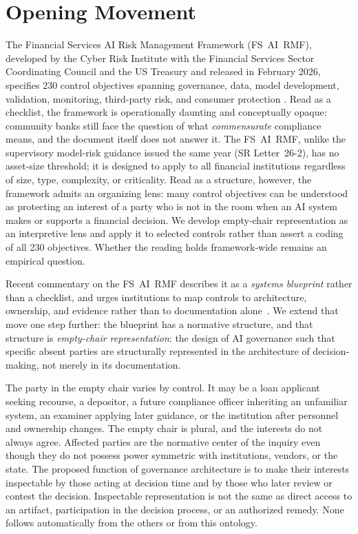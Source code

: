 %

\section{Opening Movement}
\label{sec:opening}

The Financial Services AI Risk Management Framework (FS~AI~RMF), developed by the Cyber Risk Institute with the Financial Services Sector Coordinating Council and the US Treasury and released in February 2026, specifies 230 control objectives spanning governance, data, model development, validation, monitoring, third-party risk, and consumer protection \parencite{treasuryFSAIRMFRelease2026}. Read as a checklist, the framework is operationally daunting and conceptually opaque: community banks still face the question of what \emph{commensurate} compliance means, and the document itself does not answer it. The FS~AI~RMF, unlike the supervisory model-risk guidance issued the same year (SR Letter~26-2), has no asset-size threshold; it is designed to apply to all financial institutions regardless of size, type, complexity, or criticality. Read as a structure, however, the framework admits an organizing lens: many control objectives can be understood as protecting an interest of a party who is not in the room when an AI system makes or supports a financial decision. We develop empty-chair representation as an interpretive lens and apply it to selected controls rather than assert a coding of all 230 objectives. Whether the reading holds framework-wide remains an empirical question.

Recent commentary on the FS~AI~RMF describes it as a \emph{systems blueprint} rather than a checklist, and urges institutions to map controls to architecture, ownership, and evidence rather than to documentation alone~\parencite{mushahwar2026}. We extend that move one step further: the blueprint has a normative structure, and that structure is \emph{empty-chair representation}: the design of AI governance such that specific absent parties are structurally represented in the architecture of decision-making, not merely in its documentation.

The party in the empty chair varies by control. It may be a loan applicant seeking recourse, a depositor, a future compliance officer inheriting an unfamiliar system, an examiner applying later guidance, or the institution after personnel and ownership changes. The empty chair is plural, and the interests do not always agree. Affected parties are the normative center of the inquiry even though they do not possess power symmetric with institutions, vendors, or the state. The proposed function of governance architecture is to make their interests inspectable by those acting at decision time and by those who later review or contest the decision. Inspectable representation is not the same as direct access to an artifact, participation in the decision process, or an authorized remedy. None follows automatically from the others or from this ontology.

